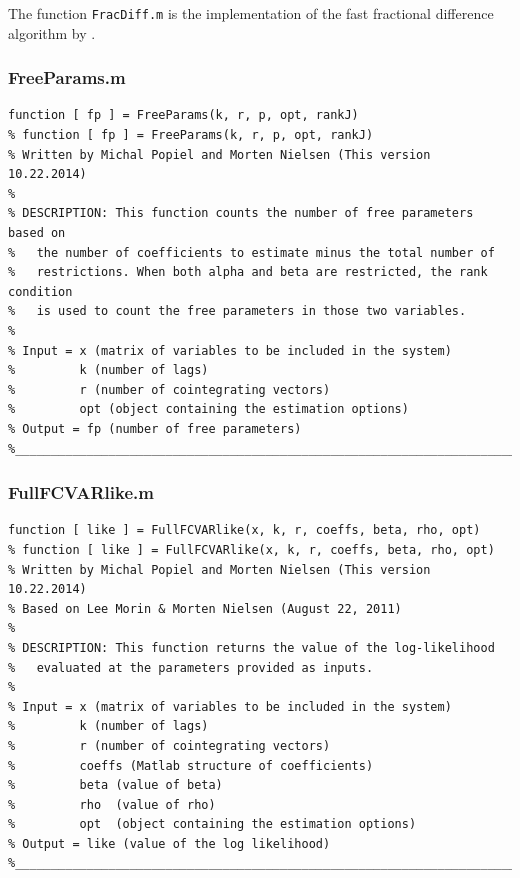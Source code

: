 \documentclass[10pt]{article}
\begin{document}
The function \verb|FracDiff.m| is the implementation of the fast fractional difference algorithm by \cite{Jensen2014}.
 

\subsubsection{FreeParams.m}
\begin{lstlisting}[frame=single,caption={FreeParams.m}]
function [ fp ] = FreeParams(k, r, p, opt, rankJ)
% function [ fp ] = FreeParams(k, r, p, opt, rankJ)
% Written by Michal Popiel and Morten Nielsen (This version 10.22.2014)
% 
% DESCRIPTION: This function counts the number of free parameters based on
% 	the number of coefficients to estimate minus the total number of
% 	restrictions. When both alpha and beta are restricted, the rank condition
% 	is used to count the free parameters in those two variables.
%
% Input = x (matrix of variables to be included in the system)
%         k (number of lags)
%         r (number of cointegrating vectors)
%         opt (object containing the estimation options)
% Output = fp (number of free parameters)
%_________________________________________________________________________
\end{lstlisting}

\subsubsection{FullFCVARlike.m}
\begin{lstlisting}[frame=single,caption={FullFCVARlike.m}]
function [ like ] = FullFCVARlike(x, k, r, coeffs, beta, rho, opt)
% function [ like ] = FullFCVARlike(x, k, r, coeffs, beta, rho, opt)
% Written by Michal Popiel and Morten Nielsen (This version 10.22.2014)
% Based on Lee Morin & Morten Nielsen (August 22, 2011)
% 
% DESCRIPTION: This function returns the value of the log-likelihood
% 	evaluated at the parameters provided as inputs.
%
% Input = x (matrix of variables to be included in the system)
%         k (number of lags)
%         r (number of cointegrating vectors)
%         coeffs (Matlab structure of coefficients)
%         beta (value of beta)
%         rho  (value of rho)
%         opt  (object containing the estimation options)
% Output = like (value of the log likelihood)
%_________________________________________________________________________
\end{lstlisting}
\end{document}
